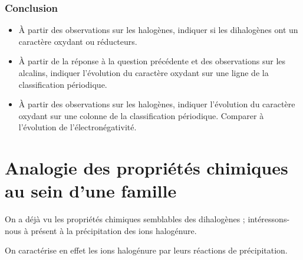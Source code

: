 \documentclass{tp}
\begin{document}
\subsubsection{Conclusion}%
\label{ssub:conclusion}

\begin{itemize}
  \item À partir des observations sur les halogènes, indiquer si les dihalogènes ont un caractère oxydant ou réducteurs.
  \item À partir de la réponse à la question précédente et des observations sur les alcalins, indiquer l'évolution du caractère oxydant sur une ligne de la classification périodique.
  \item À partir des observations sur les halogènes, indiquer l'évolution du caractère oxydant sur une colonne de la classification périodique. Comparer à l'évolution de l'électronégativité.
\end{itemize} 

\section{Analogie des propriétés chimiques au sein d'une famille}%
\label{sec:analogie_des_proprietes_chimiques_au_sein_d_une_famille}
On a déjà vu les propriétés chimiques semblables des dihalogènes ; intéressons-nous à présent à la précipitation
des ions halogénure.

On caractérise en effet les ions halogénure  par leurs réactions de précipitation.
\end{document}
